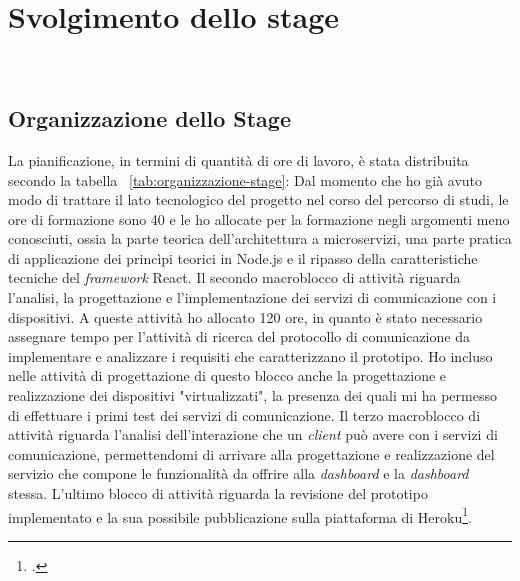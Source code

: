 
\pagebreak
\chapter{Svolgimento dello stage}
\label{cap:descrizione-stage}

\\

\section{Organizzazione dello Stage}

La pianificazione, in termini di quantità di ore di lavoro, è stata distribuita secondo la tabella ~\ref{tab:organizzazione-stage}:
Dal momento che ho già avuto modo di trattare il lato tecnologico del progetto nel corso del percorso di studi, le ore di formazione sono 40 e le ho allocate per la formazione negli argomenti meno conosciuti, ossia la parte teorica dell'architettura a microservizi, una parte pratica di applicazione dei princìpi teorici in Node.js e il ripasso della caratteristiche tecniche del \emph{framework} React.
Il secondo macroblocco di attività riguarda l'analisi, la progettazione e l'implementazione dei servizi di comunicazione con i dispositivi. A queste attività ho allocato 120 ore, in quanto è stato necessario assegnare tempo per l'attività di ricerca del protocollo di comunicazione da implementare e analizzare i requisiti che caratterizzano il prototipo. Ho incluso nelle attività di progettazione di questo blocco anche la progettazione e realizzazione dei dispositivi "virtualizzati", la presenza dei quali mi ha permesso di effettuare i primi test dei servizi di comunicazione.
Il terzo macroblocco di attività riguarda l'analisi dell'interazione che un \emph{client} può avere con i servizi di comunicazione, permettendomi di arrivare alla progettazione e realizzazione del servizio che compone le funzionalità da offrire alla \emph{dashboard} e la \emph{dashboard} stessa.
L'ultimo blocco di attività riguarda la revisione del prototipo implementato e la sua possibile pubblicazione sulla piattaforma di Heroku\footcite{heroku}.


